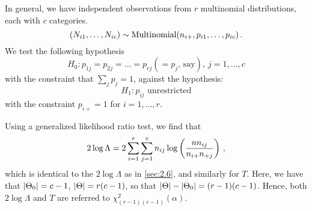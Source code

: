 In general, we have independent observations from $r$ multinomial distributions, each with $c$ categories.
\[
(N_{i1}, \dotsc, N_{ic}) \sim \text{Multinomial}(n_{i+}, p_{i1}, \dotsc, p_{ic}) \, {.}
\]
We test the following hypothesis
\[
H_0 : p_{1j} = p_{2j} = \dotsc = p_{rj} ( = p_j \text{, say}), \ j = 1, \dotsc, c
\]
with the constraint that $\sum_j p_j = 1$, against the hypothesis:
\[
H_1 : p_{ij} \text{ unrestricted}
\]
with the constraint $p_{i+} = 1$ for $i = 1, \dotsc, r$.

Using a generalized likelihood ratio test, we find that
\[
2 \log \Lambda = 2 \sum_{i = 1}^r \sum_{j = 1}^c n_{ij} \log \left( \frac{n n_{ij}}{n_{i+}n_{+j}} \right) \, {,}
\]
which is identical to the $2 \log \Lambda$ as in \cref{sec:2.6}, and similarly for $T$.
Here, we have that $\lvert\Theta_0\rvert = c-1$, $\lvert\Theta\rvert = r(c-1)$, so that $\lvert\Theta\rvert - \lvert\Theta_0\rvert = (r-1)(c-1)$.
Hence, both $2 \log \Lambda$ and $T$ are referred to $\chi^2_{(r-1)(c-1)} (\alpha)$.


